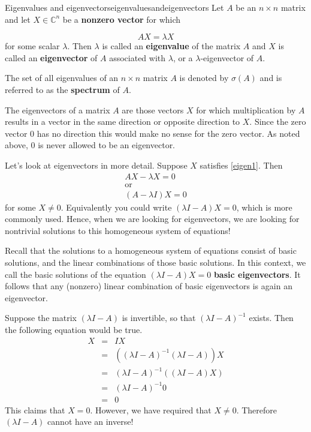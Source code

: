 \begin{definition}{Eigenvalues and eigenvectors}{eigenvaluesandeigenvectors}
Let $A$ be an $n\times n$ matrix and let $X \in \mathbb{C}^{n}$ be a
\textbf{nonzero vector} for which

\begin{equation}
AX=\lambda X  \label{eigen1}
\end{equation}
for some scalar $\lambda .$ Then $\lambda $ is called an
\textbf{eigenvalue}
of the matrix $A$ and $X$ is called an \textbf{eigenvector} of $A$ associated with $\lambda$, or a $\lambda$-eigenvector of $A$. 
 
The set of all eigenvalues of an $n\times n$ matrix $A$ is denoted by 
$\sigma \left( A\right) $ and is referred to as the \textbf{spectrum} of $A.$
\end{definition}

The eigenvectors of a matrix $A$ are those vectors $X$ for which
multiplication by $A$ results in a vector in the same direction or opposite
direction to $X$. Since the zero vector $0$ has no
direction this would make no sense for the zero vector. As noted above, 
$0$ is never allowed to be an eigenvector. 

Let's look at eigenvectors in more detail. Suppose $X$ satisfies \ref{eigen1}. Then
\begin{equation*}
\begin{array}{c}
AX - \lambda X = 0 \\
\mbox{or} \\
\left( A-\lambda I\right) X = 0
\end{array}
\end{equation*}
for some $X \neq 0.$ Equivalently you could write $\left( \lambda
I-A\right)X = 0$, which is more commonly used.  Hence, when we are looking for eigenvectors, we are
looking for nontrivial solutions to this homogeneous system of equations!

Recall that the solutions to a homogeneous system of equations consist
of basic solutions, and the linear combinations of those basic
solutions. In this context, we call the basic solutions of the
equation $\left( \lambda I - A\right) X = 0$ \textbf{basic
eigenvectors}. It follows that any (nonzero) linear combination of basic
eigenvectors is again an eigenvector.

Suppose the matrix $\left(\lambda I - A\right)$ is invertible, so that
$\left(\lambda I - A\right)^{-1}$ exists.
Then the following equation would be true.
\begin{eqnarray*}
X &=& IX \\
&=& \left( \left( \lambda I - A\right) ^{-1}\left(\lambda I - A \right)
\right) X \\
&=&\left( \lambda I - A\right) ^{-1}\left( \left( \lambda
I - A\right) X\right) \\
&=& \left( \lambda I - A\right) ^{-1}0 \\
&=& 0
\end{eqnarray*}
This claims that $X=0$. However, we have required that $ X \neq 0$. Therefore  $\left(\lambda I - A\right)$
cannot have an inverse! 

